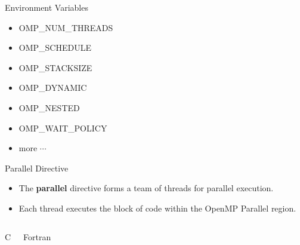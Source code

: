 \documentclass[c,mathserif,compress,xcolor=svgnames]{beamer}
\newenvironment{eblock}[0]
{
\begin{beamerboxesrounded}[upper=uppercol2,lower=lowercol2,shadow=true]}
{\end{beamerboxesrounded}}
\begin{document}
\begin{frame}{\small Environment Variables}
  \begin{itemize}
    \item OMP\_NUM\_THREADS
    \item OMP\_SCHEDULE
    \item OMP\_STACKSIZE
    \item OMP\_DYNAMIC
    \item OMP\_NESTED
    \item OMP\_WAIT\_POLICY
    \item more $\cdots$
  \end{itemize}
\end{frame}

\begin{frame}{\small Parallel Directive}
  \begin{itemize}
    \item The {\bf parallel} directive forms a team of threads for parallel execution.
    \item Each thread executes the block of code within the OpenMP Parallel region.
  \end{itemize}
  \begin{columns}
    \begin{eblock}{C}
      
    \end{eblock}
    \begin{eblock}{Fortran}
      
    \end{eblock}
  \end{columns}
\end{frame}
\scriptsize
\end{document}
